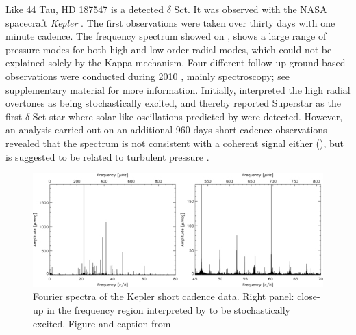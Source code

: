 Like 44 Tau, HD 187547 is a detected $\delta$ Sct. It was observed  with the NASA spacecraft \textit{Kepler} \citet{koch2010kepler}. The first observations were taken over thirty days with one minute cadence. The frequency spectrum showed on , shows a large range of pressure modes for both high and low order radial modes, which could not be explained solely by the Kappa mechanism. Four different follow up ground-based observations were conducted during 2010 \citet{antoci2011excitation}, mainly spectroscopy; see \citet{antoci2011excitation} supplementary material for more information. Initially, \citet{antoci2011excitation} interpreted the high radial overtones as being stochastically excited, and thereby reported Superstar as the first $\delta$ Sct star where solar-like oscillations predicted by \citet{houdek1999, samadi2002} were detected.  However, an analysis carried out on an additional 960 days short cadence observations revealed that the spectrum is not consistent with a coherent signal either (), but is suggested to be related to turbulent pressure \citep{antoci2014role}. 

\begin{figure}[htbp]
    \centering
    \includegraphics[width=1\textwidth]{superstarspectrum.jpg}
    \caption{Fourier spectra of the Kepler short cadence data. Right panel: close-up in the frequency region interpreted by \citet{antoci2011solar} to be stochastically excited. Figure and caption from \citet{antoci2014role}}
    \label{ssspectrum}
\end{figure}

